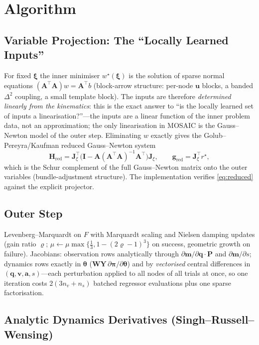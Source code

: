\documentclass[11pt,a4paper]{article}
\newcommand{\bq}{\mathbf{q}}
\newcommand{\bv}{\mathbf{v}}
\newcommand{\ba}{\mathbf{a}}
\newcommand{\bu}{\mathbf{u}}
\newcommand{\bY}{\mathbf{Y}}
\newcommand{\bJ}{\mathbf{J}}
\newcommand{\bA}{\mathbf{A}}
\newcommand{\bP}{\mathbf{P}}
\newcommand{\bW}{\mathbf{W}}
\newcommand{\bpi}{\boldsymbol{\pi}}
\newcommand{\btheta}{\boldsymbol{\theta}}
\newcommand{\bxi}{\boldsymbol{\xi}}
\begin{document}
\section{Algorithm}
\label{sec:algorithm}

\subsection{Variable Projection: The ``Locally Learned Inputs''}
For fixed $\bxi$ the inner minimiser $w^\star(\bxi)$ is the solution of sparse
normal equations $(\bA^{\!\top}\bA)w=\bA^{\!\top}b$ (block-arrow structure:
per-node $\bu$ blocks, a banded $\Delta^2$ coupling, a small template block).
The inputs are therefore \emph{determined linearly from the kinematics}: this
is the exact answer to ``is the locally learned set of inputs a
linearisation?''---the inputs are a linear function of the inner problem
data, not an approximation; the only linearisation in MOSAIC is the
Gauss--Newton model of the outer step.  Eliminating $w$ exactly gives the
Golub--Pereyra/Kaufman reduced Gauss--Newton system
\begin{equation}
  \mathbf{H}_{\mathrm{red}}=\bJ_\xi^{\!\top}\big(\mathbf{I}-\bA(\bA^{\!\top}\bA)^{-1}\bA^{\!\top}\big)\bJ_\xi,
  \qquad
  \mathbf{g}_{\mathrm{red}}=\bJ_\xi^{\!\top}r^\star ,
  \label{eq:reduced}
\end{equation}
which is the Schur complement of the full Gauss--Newton matrix onto the outer
variables (bundle-adjustment structure).  The implementation verifies
\eqref{eq:reduced} against the explicit projector.

\subsection{Outer Step}
Levenberg--Marquardt on $F$ with Marquardt scaling and Nielsen damping updates
(gain ratio $\varrho$; $\mu\leftarrow\mu\max\{\tfrac13,1-(2\varrho-1)^3\}$ on
success, geometric growth on failure).  Jacobians:
observation rows analytically through $\partial\mathbf{m}/\partial\bq\cdot\bP$
and $\partial\mathbf{m}/\partial s$; dynamics rows exactly in $\btheta$
($\bW\bY\,\partial\bpi/\partial\btheta$) and by \emph{vectorised} central
differences in $(\bq,\bv,\ba,s)$---each perturbation applied to all nodes of
all trials at once, so one iteration costs $2(3n_v+n_s)$ batched regressor
evaluations plus one sparse factorisation.  \subsection{Analytic Dynamics Derivatives (Singh--Russell--Wensing)}
\label{subsec:analytic_derivatives}
\end{document}
